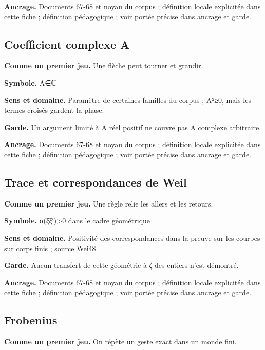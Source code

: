 \documentclass[
  9pt,
  a4paper,
]{article}
\begin{document}
\textbf{Ancrage.} Documents 67-68 et noyau du corpus ; définition locale
explicitée dans cette fiche ; définition pédagogique ; voir portée
précise dans ancrage et garde.

\hypertarget{coefficient-complexe-a}{%
\subsection{Coefficient complexe A}\label{coefficient-complexe-a}}

\textbf{Comme un premier jeu.} Une flèche peut tourner et grandir.

\textbf{Symbole.} A∈ℂ

\textbf{Sens et domaine.} Paramètre de certaines familles du corpus ;
\textbar A\textbar²≥0, mais les termes croisés gardent la phase.

\textbf{Garde.} Un argument limité à A réel positif ne couvre pas A
complexe arbitraire.

\textbf{Ancrage.} Documents 67-68 et noyau du corpus ; définition locale
explicitée dans cette fiche ; définition pédagogique ; voir portée
précise dans ancrage et garde.

\hypertarget{trace-et-correspondances-de-weil}{%
\subsection{Trace et correspondances de
Weil}\label{trace-et-correspondances-de-weil}}

\textbf{Comme un premier jeu.} Une règle relie les allers et les
retours.

\textbf{Symbole.} σ(ξξ′)\textgreater0 dans le cadre géométrique

\textbf{Sens et domaine.} Positivité des correspondances dans la preuve
sur les courbes sur corps finis ; source Wei48.

\textbf{Garde.} Aucun transfert de cette géométrie à ζ des entiers n'est
démontré.

\textbf{Ancrage.} Documents 67-68 et noyau du corpus ; définition locale
explicitée dans cette fiche ; définition pédagogique ; voir portée
précise dans ancrage et garde.

\hypertarget{frobenius}{%
\subsection{Frobenius}\label{frobenius}}

\textbf{Comme un premier jeu.} On répète un geste exact dans un monde
fini.
\end{document}
